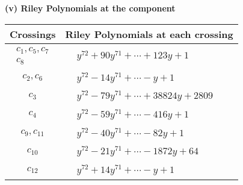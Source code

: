 \documentclass[1p]{elsarticle_modified}
\theoremstyle{definition}
\begin{document}
\newpage\renewcommand{\arraystretch}{1}
\flushleft \textbf{(v) Riley Polynomials at the component}\newline \\
\begin{tabular}{m{50pt}|m{274pt}}
Crossings & \hspace{64pt}Riley Polynomials at each crossing \\
\hline $$\begin{aligned}c_{1},c_{5},c_{7}\\c_{8}\end{aligned}$$&$\begin{aligned}
&y^{72}+90 y^{71}+\cdots+123 y+1
\end{aligned}$\\
\hline $$\begin{aligned}c_{2},c_{6}\end{aligned}$$&$\begin{aligned}
&y^{72}-14 y^{71}+\cdots- y+1
\end{aligned}$\\
\hline $$\begin{aligned}c_{3}\end{aligned}$$&$\begin{aligned}
&y^{72}-79 y^{71}+\cdots+38824 y+2809
\end{aligned}$\\
\hline $$\begin{aligned}c_{4}\end{aligned}$$&$\begin{aligned}
&y^{72}-59 y^{71}+\cdots-416 y+1
\end{aligned}$\\
\hline $$\begin{aligned}c_{9},c_{11}\end{aligned}$$&$\begin{aligned}
&y^{72}-40 y^{71}+\cdots-82 y+1
\end{aligned}$\\
\hline $$\begin{aligned}c_{10}\end{aligned}$$&$\begin{aligned}
&y^{72}-21 y^{71}+\cdots-1872 y+64
\end{aligned}$\\
\hline $$\begin{aligned}c_{12}\end{aligned}$$&$\begin{aligned}
&y^{72}+14 y^{71}+\cdots- y+1
\end{aligned}$\\
\hline
\end{tabular}\\~\\
\end{document}
